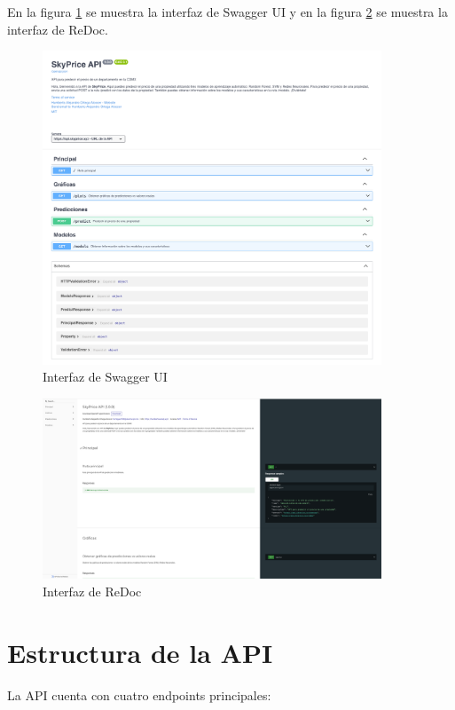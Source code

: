 En la figura \ref{fig:swagger} se muestra la interfaz de Swagger UI y en la figura
\ref{fig:redoc} se muestra la interfaz de ReDoc.

\begin{figure}[H]
\centering
\includegraphics[width=0.9\textwidth]{imagenes/06-api-publica/swagger.png}
\caption{Interfaz de Swagger UI}
\label{fig:swagger}
\end{figure}

\begin{figure}[H]
\centering
\includegraphics[width=0.9\textwidth]{imagenes/06-api-publica/redoc.png}
\caption{Interfaz de ReDoc}
\label{fig:redoc}
\end{figure}

\section{Estructura de la API}
La API cuenta con cuatro endpoints principales:

